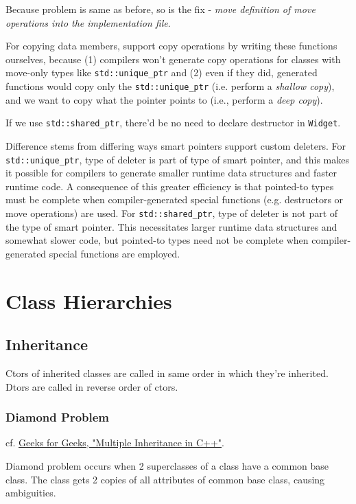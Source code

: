 \documentclass[10pt]{amsart}
\begin{document}
Because problem is same as before, so is the fix - \emph{move definition of move operations into the implementation file}.  

For copying data members, support copy operations by writing these functions ourselves, because (1) compilers won't generate copy operations for classes with move-only types like \verb|std::unique_ptr| and (2) even if they did, generated functions would copy only the \verb|std::unique_ptr| (i.e. perform a \emph{shallow copy}), and we want to copy what the pointer points to (i.e., perform a \emph{deep copy}).  

If we use \verb|std::shared_ptr|, there'd be no need to declare destructor in \verb|Widget|.  

Difference stems from differing ways smart pointers support custom deleters.  For \verb|std::unique_ptr|, type of deleter is part of type of smart pointer, and this makes it possible for compilers to generate smaller runtime data structures and faster runtime code.  A consequence of this greater efficiency is that pointed-to types must be complete when compiler-generated special functions (e.g. destructors or move operations) are used.  For \verb|std::shared_ptr|, type of deleter is not part of the type of smart pointer.  This necessitates larger runtime data structures and somewhat slower code, but pointed-to types need not be complete when compiler-generated special functions are employed.  

\section{Class Hierarchies}

\subsection{Inheritance}

Ctors of inherited classes are called in same order in which they're inherited. Dtors are called in reverse order of ctors.

\subsubsection{Diamond Problem}

cf. \href{https://www.geeksforgeeks.org/multiple-inheritance-in-c/}{Geeks for Geeks, "Multiple Inheritance in C++"}.

Diamond problem occurs when 2 superclasses of a class have a common base class. The class gets 2 copies of all attributes of common base class, causing ambiguities.
\end{document}
